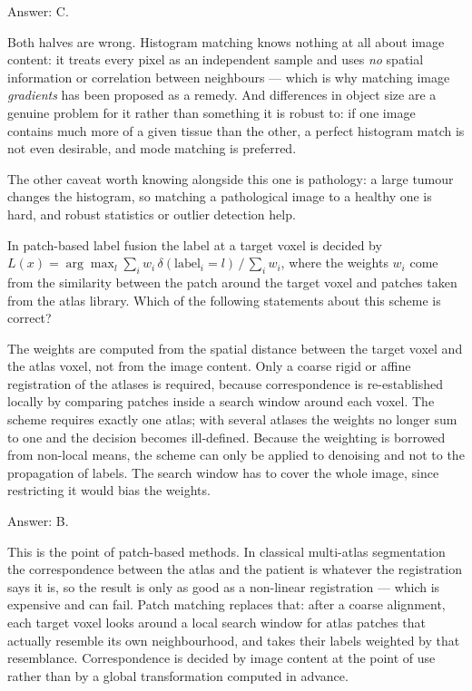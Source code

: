 \documentclass[11pt]{exam}
\begin{document}
\begin{questions}
\begin{solution}
  Answer: C.

  Both halves are wrong. Histogram matching knows nothing at all about image content: it treats
  every pixel as an independent sample and uses \emph{no} spatial information or correlation
  between neighbours --- which is why matching image \emph{gradients} has been proposed as a
  remedy. And differences in object size are a genuine problem for it rather than something it is
  robust to: if one image contains much more of a given tissue than the other, a perfect histogram
  match is not even desirable, and mode matching is preferred.

  The other caveat worth knowing alongside this one is pathology: a large tumour changes the
  histogram, so matching a pathological image to a healthy one is hard, and robust statistics or
  outlier detection help.
\end{solution}

\question
In patch-based label fusion the label at a target voxel is decided by
$L(x) = \arg\max_l \sum_i w_i\, \delta(\text{label}_i = l) \,/\, \sum_i w_i$, where the weights
$w_i$ come from the similarity between the patch around the target voxel and patches taken from
the atlas library. Which of the following statements about this scheme is correct?

\begin{choices}
  \choice The weights are computed from the spatial distance between the target voxel and the atlas
  voxel, not from the image content.
  \choice Only a coarse rigid or affine registration of the atlases is required, because
  correspondence is re-established locally by comparing patches inside a search window around each
  voxel.
  \choice The scheme requires exactly one atlas; with several atlases the weights no longer sum to
  one and the decision becomes ill-defined.
  \choice Because the weighting is borrowed from non-local means, the scheme can only be applied to
  denoising and not to the propagation of labels.
  \choice The search window has to cover the whole image, since restricting it would bias the
  weights.
\end{choices}

\begin{solution}
  Answer: B.

  This is the point of patch-based methods. In classical multi-atlas segmentation the
  correspondence between the atlas and the patient is whatever the registration says it is, so the
  result is only as good as a non-linear registration --- which is expensive and can fail. Patch
  matching replaces that: after a coarse alignment, each target voxel looks around a local search
  window for atlas patches that actually resemble its own neighbourhood, and takes their labels
  weighted by that resemblance. Correspondence is decided by image content at the point of use
  rather than by a global transformation computed in advance.


\end{solution}
\end{questions}
\end{document}
